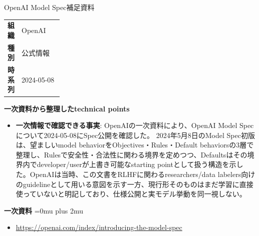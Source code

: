 \begin{technicalnote}{OpenAI Model Spec}{補足資料}
\begingroup
\begin{tabularx}{\linewidth}{@{}>{\bfseries}p{0.22\linewidth}X@{}}
組織 & OpenAI \\
種別 & 公式情報 \\
時系列 & 2024-05-08 \\
\end{tabularx}
\smallskip
\begin{minipage}{\linewidth}
{\bfseries 一次資料から整理したtechnical points}
\begin{itemize}[leftmargin=1.5em,itemsep=0.35em]
\item \textbf{一次情報で確認できる事実}: OpenAIの一次資料により、OpenAI Model Specについて2024-05-08にSpec公開を確認した。 2024年5月8日のModel Spec初版は、望ましいmodel behaviorをObjectives・Rules・Default behaviorsの3層で整理し、Rulesで安全性・合法性に関わる境界を定めつつ、Defaultsはその境界内でdeveloper/userが上書き可能なstarting pointとして扱う構造を示した。OpenAIは当時、この文書をRLHFに関わるresearchers/data labelers向けのguidelineとして用いる意図を示す一方、現行形そのものはまだ学習に直接使っていないと明記しており、仕様公開と実モデル挙動を同一視しない。
\end{itemize}
\begin{minipage}{\linewidth}
\begin{samepage}
{\bfseries 一次資料}
\begingroup\sloppy
\Urlmuskip=0mu plus 2mu\relax
\begin{itemize}[leftmargin=1.5em,itemsep=0.25em]
\item {\scriptsize\url{https://openai.com/index/introducing-the-model-spec}}
\end{itemize}
\endgroup
\end{samepage}
\end{minipage}
\end{minipage}
\endgroup
\end{technicalnote}
\medskip

